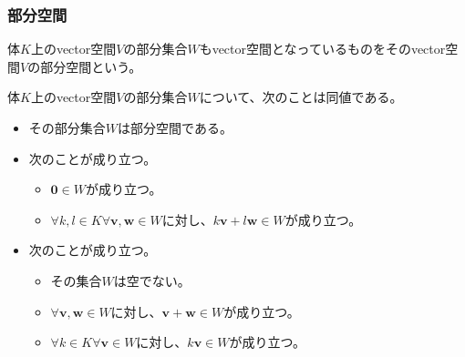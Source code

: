 \documentclass[dvipdfmx]{jsarticle}
\begin{document}
\subsubsection{部分空間}%
\begin{dfn}
体$K$上のvector空間$V$の部分集合$W$もvector空間となっているものをそのvector空間$V$の部分空間という。
\end{dfn}
\begin{thm}\label{2.1.1.9}
体$K$上のvector空間$V$の部分集合$W$について、次のことは同値である。
\begin{itemize}
\item
  その部分集合$W$は部分空間である。
\item
  次のことが成り立つ。
  \begin{itemize}
  \item
    $\mathbf{0} \in W$が成り立つ。
  \item
    $\forall k,l \in K\forall\mathbf{v},\mathbf{w} \in W$に対し、$k\mathbf{v} + l\mathbf{w} \in W$が成り立つ。
  \end{itemize}
\item
  次のことが成り立つ。
  \begin{itemize}
  \item
    その集合$W$は空でない。
  \item
    $\forall\mathbf{v},\mathbf{w} \in W$に対し、$\mathbf{v} + \mathbf{w} \in W$が成り立つ。
  \item
    $\forall k \in K\forall\mathbf{v} \in W$に対し、$k\mathbf{v} \in W$が成り立つ。
  \end{itemize}
\end{itemize}
\end{thm}
\end{document}
